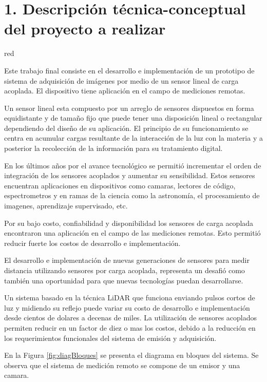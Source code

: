 \documentclass[
11pt, %
codirector, %
]{charter}
\begin{document}
\section{1. Descripción técnica-conceptual del proyecto a realizar}
\label{sec:descripcion}


\begin{consigna}{red} %

Este trabajo final consiste en el desarrollo e implementación de un prototipo de sistema  de adquisición de imágenes por medio de un sensor lineal de carga acoplada. El dispositivo tiene aplicación en el campo de mediciones remotas. 

Un sensor lineal esta compuesto por un arreglo de sensores dispuestos en forma equidistante y de tamaño fijo que puede tener una disposición lineal o rectangular dependiendo del diseño de su aplicación. El principio de su funcionamiento se centra en acumular cargas resultante de la interacción de la luz con la materia y a posterior la recolección de la información para su tratamiento digital.

En los últimos años por el avance tecnológico se permitió incrementar el orden de integración de los sensores acoplados y aumentar su sensibilidad. Estos sensores encuentran aplicaciones en dispositivos como camaras, lectores de código, espectrometros y en ramas de la ciencia como la astronomía, el procesamiento de imagenes, aprendizaje supervisado, etc.

Por su bajo costo, confiabilidad y disponibilidad los sensores de carga acoplada encontraron una aplicación en el campo de las mediciones remotas. Esto permitió reducir fuerte los costos de desarrollo e implementación. 

El desarrollo e implementación de nuevas generaciones de sensores para medir distancia utilizando sensores por carga acoplada, representa un desafió como también una oportunidad para que nuevas tecnologías puedan desarrollarse.

Un sistema  basado en la técnica  LiDAR que funciona enviando pulsos cortos de luz y midiendo su reflejo puede variar su costo de desarrollo e implementación desde cientos de dolares a decenas de miles. La utilización de sensores acoplados permiten reducir en un factor de diez o mas los costos, debido a la reducción en los requerimientos funcionales del sistema de emisión y adquisición. 


En la Figura \ref{fig:diagBloques} se presenta el diagrama en bloques del sistema. Se observa que el sistema de medición remoto se compone de un emisor y una camara. 


\end{consigna}
\end{document}
